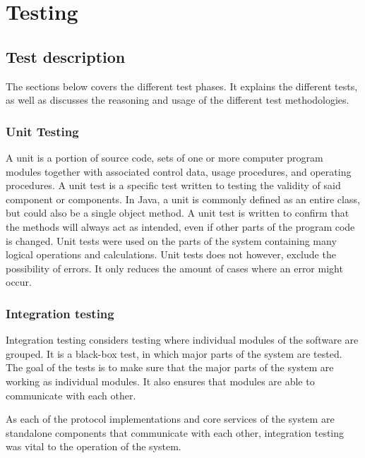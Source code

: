 
\chapter{Testing}
\label{ch:testing}

\section{Test description}
\label{sec:testing-test_description}

The sections below covers the different test phases. It explains the different tests, as well as discusses the reasoning and usage of the different test methodologies.

\subsection{Unit Testing}
\label{subsec:testing-test_description-unit_testing}

A unit is a portion of source code, sets of one or more computer program modules together with associated control data, usage procedures, and operating procedures. A unit test is a specific test written to testing the validity of said component or components. In Java, a unit is commonly defined as an entire class, but could also be a single object method. A unit test is written to confirm that the methods will always act as intended, even if other parts of the program code is changed. Unit tests were used on the parts of the system containing many logical operations and calculations. Unit tests does not however, exclude the possibility of errors. It only reduces the amount of cases where an error might occur.

\subsection{Integration testing}
\label{subsec:testing-test_description-integration_testing}

Integration testing considers testing where individual modules of the software are grouped. It is a black-box test, in which major parts of the system are tested. The goal of the tests is to make sure that the major parts of the system are working as individual modules. It also ensures that modules are able to communicate with each other.

As each of the protocol implementations and core services of the system are standalone components that communicate with each other, integration testing was vital to the operation of the system. 

